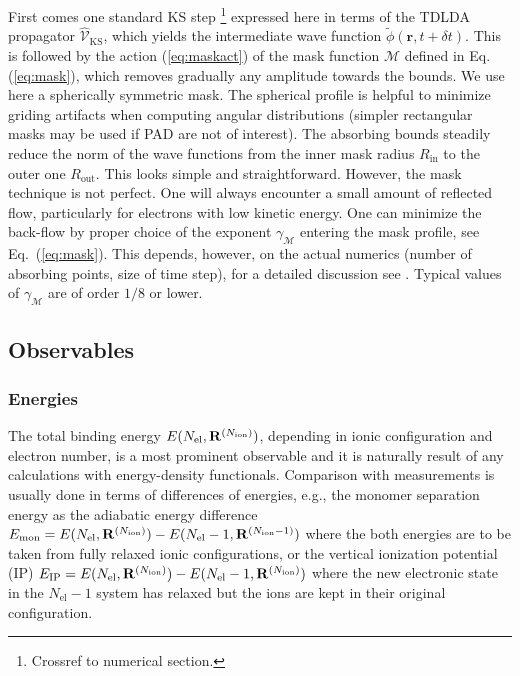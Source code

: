 \documentclass[final,1p]{elsarticle}
\newcommand{\PGRfoot}[1]{{\color{blue}\footnote{\color{blue} #1}}}
\begin{document}
%
First comes one standard KS step \PGRfoot{Crossref to numerical
  section.} expressed here in terms of the TDLDA propagator
$\hat{\mathcal{V}}_\mathrm{KS}$, which yields the intermediate wave
function $\tilde\phi(\mathbf{r},t\!+\!\delta{t})$. This is followed by
the action (\ref{eq:maskact}) of the mask function $\mathcal{M}$
defined in Eq.(\ref{eq:mask}), which removes gradually any amplitude
towards the bounds. We use here a spherically symmetric mask. The
spherical profile is helpful to minimize griding artifacts when
computing angular distributions \cite{Poh04b} (simpler rectangular
masks may be used if PAD are not of interest). The absorbing bounds
steadily reduce the norm of the wave functions from the inner mask
radius $R_\mathrm{in}$ to the outer one $R_\mathrm{out}$.  This looks
simple and straightforward. However, the mask technique is not
perfect. One will always encounter a small amount of reflected flow,
particularly for electrons with low kinetic energy. One can minimize
the back-flow by proper choice of the exponent $\gamma_\mathcal{M}$
entering the mask profile, see Eq.~(\ref{eq:mask}). This depends,
however, on the actual numerics (number of absorbing points, size of
time step), for a detailed discussion see \cite{Rei06c}. Typical
values of $\gamma_\mathcal{M}$ are of order $1/8$ or lower.


\subsection{Observables}
\label{sec:observ}


\subsubsection{Energies}
\label{sec:energies}

The total binding energy $E(N_\mathrm{el},{\bf R}^{(N_\mathrm{ion})})$,
depending in ionic configuration and electron number, is a most
prominent observable and it is naturally result of any calculations
with energy-density functionals.  Comparison with measurements is
usually done in terms of differences of energies, e.g., the monomer
separation energy as the adiabatic energy difference
%
$E_\mathrm{mon}=E(N_\mathrm{el},{\bf R}^{(N_\mathrm{ion})})
            -E(N_\mathrm{el}-1,{\bf R}^{(N_\mathrm{ion}-1)})$
%
where the both energies are to be taken from fully relaxed ionic
configurations, or the vertical ionization potential
(IP)
%
$E_\mathrm{IP}=E(N_\mathrm{el},{\bf R}^{(N_\mathrm{ion})})
            -E(N_\mathrm{el}-1,{\bf R}^{(N_\mathrm{ion})})$
%
where the new electronic state in the $N_\mathrm{el}-1$ system has
relaxed but the ions are kept in their original configuration.
\end{document}
